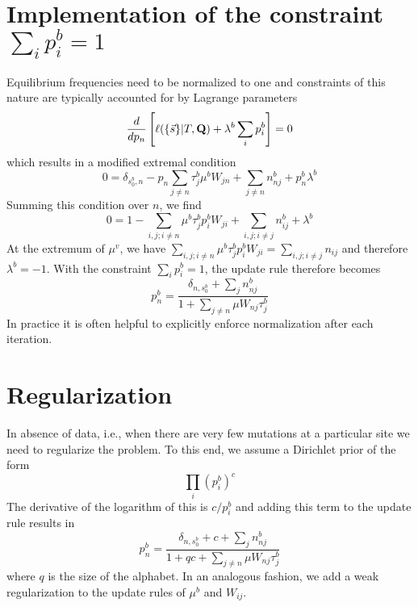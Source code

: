 \documentclass[aps,rmp,onecolumn]{revtex4}
\newcommand{\mat}[1]{{\bf #1}}
\newcommand{\eqp}{p}
\newcommand{\lh}{\ell}
\begin{document}
\section*{Implementation of the constraint $\sum_i \eqp_i^b=1$}
Equilibrium frequencies need to be normalized to one and constraints of this nature are typically accounted for by Lagrange parameters
\begin{equation}
	\frac{d}{d \eqp_n} \left[\lh (\{\vec{s}\} |T, \mat{Q}) + \lambda^b \sum_i \eqp^b_i \right] = 0
\end{equation}
which results in a modified extremal condition
\begin{equation}
	0 = \delta_{s^b_0,n}-\eqp_{n}\sum_{j\neq n} \tau^b_j \mu^b W_{j n} + \sum_{j\neq n} n^b_{nj} + \eqp^b_{n}\lambda^b
\end{equation}
Summing this condition over $n$, we find
\begin{equation}
	0 = 1 - \sum_{i,j; i \neq n}  \mu^b \tau^b_j \eqp^b_{i}W_{j i} + \sum_{i,j; i\neq j} n^b_{ij} + \lambda^b
\end{equation}
At the extremum of $\mu^v$, we have $\sum_{i,j; i \neq n} \mu^b \tau^b_j \eqp^b_{i}W_{j i} = \sum_{i,j; i\neq j} n_{ij}$ and therefore $\lambda^b=-1$.
With the constraint $\sum_i \eqp_i^b=1$, the update rule therefore becomes
\begin{equation}
	\eqp^b_n = \frac{\delta_{n,s^b_0}+\sum_j n^b_{nj}}{1 + \sum_{j\neq n} \mu W_{nj}\tau^b_j}
\end{equation}
In practice it is often helpful to explicitly enforce normalization after each iteration.

\section*{Regularization}
In absence of data, i.e., when there are very few mutations at a particular site we need to regularize the problem.
To this end, we assume a Dirichlet prior of the form
\begin{equation}
\prod_i \left(\eqp^b_i\right)^c
\end{equation}
The derivative of the logarithm of this is $c/\eqp^b_i$ and adding this term to the update rule results in
\begin{equation}
	\eqp^b_n = \frac{\delta_{n,s^b_0} + c +\sum_j n^b_{nj}}{1 + qc + \sum_{j\neq n} \mu W_{nj}\tau^b_j}
\end{equation}
where $q$ is the size of the alphabet.
In an analogous fashion, we add a weak regularization to the update rules of $\mu^b$ and $W_{ij}$.
\end{document}

